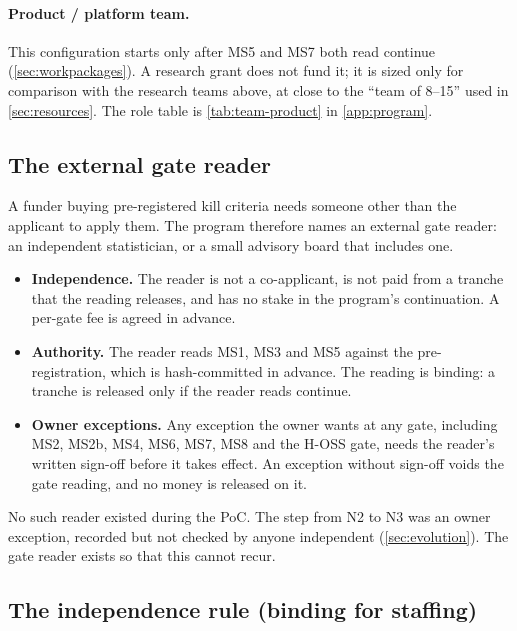 \paragraph{Product / platform team.} \evfut{} This configuration starts only after MS5 and MS7
both read continue (\cref{sec:workpackages}). A research grant does not fund it; it is sized only
for comparison with the research teams above, at close to the \enquote{team of 8--15} used in
\cref{sec:resources}. The role table is \cref{tab:team-product} in \cref{app:program}.

\subsection{The external gate reader}
\label{sec:gate-reader}

\evint{} A funder buying pre-registered kill criteria needs someone other than the applicant to
apply them. The program therefore names an external gate reader: an independent statistician, or
a small advisory board that includes one.

\begin{itemize}[noitemsep]
  \item \textbf{Independence.} The reader is not a co-applicant, is not paid from a tranche that
    the reading releases, and has no stake in the program's continuation. A per-gate fee is agreed
    in advance.
  \item \textbf{Authority.} The reader reads MS1, MS3 and MS5 against the pre-registration,
    which is hash-committed in advance. The reading is binding: a tranche is released only if the reader reads
    continue.
  \item \textbf{Owner exceptions.} Any exception the owner wants at any gate, including MS2, MS2b,
    MS4, MS6, MS7, MS8 and the H-OSS gate, needs the reader's written sign-off before it takes effect. An exception
    without sign-off voids the gate reading, and no money is released on it.
\end{itemize}

No such reader existed during the PoC. The step from N2 to N3 was an owner exception, recorded
but not checked by anyone independent (\cref{sec:evolution}). The gate reader exists so that this
cannot recur.

\subsection{The independence rule (binding for staffing)}

